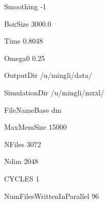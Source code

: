 Smoothing -1

BoxSize 3000.0

Time    0.8048

Omega0  0.25

OutputDir /u/mingli/data/

SimulationDir /u/mingli/mxxl/

FileNameBase dm

MaxMemSize 15000

NFiles 3072

Ndim   2048

CYCLES 1

NumFilesWrittenInParallel 96

